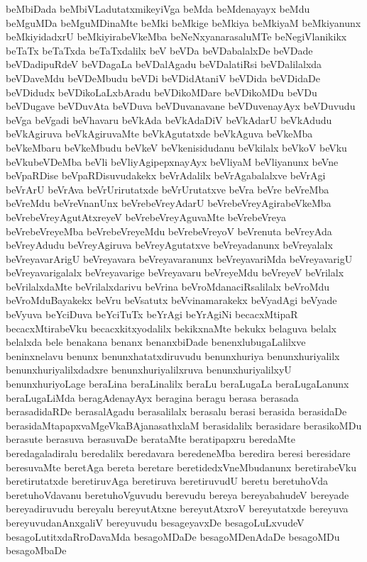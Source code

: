 {beMbiDada
beMbiVLadutatxmikeyiVga
beMda
beMdenayayx
beMdu
beMguMDa
beMguMDinaMte
beMki
beMkige
beMkiya
beMkiyaM
beMkiyanunx
beMkiyidadxrU
beMkiyirabeVkeMba
beNeNxyanarasaluMTe
beNegiVlanikikx
beTaTx
beTaTxda
beTaTxdalilx
beV
beVDa
beVDabalalxDe
beVDade
beVDadipuRdeV
beVDagaLa
beVDalAgadu
beVDalatiRsi
beVDalilalxda
beVDaveMdu
beVDeMbudu
beVDi
beVDidAtaniV
beVDida
beVDidaDe
beVDidudx
beVDikoLaLxbAradu
beVDikoMDare
beVDikoMDu
beVDu
beVDugave
beVDuvAta
beVDuva
beVDuvanavane
beVDuvenayAyx
beVDuvudu
beVga
beVgadi
beVhavaru
beVkAda
beVkAdaDiV
beVkAdarU
beVkAdudu
beVkAgiruva
beVkAgiruvaMte
beVkAgutatxde
beVkAguva
beVkeMba
beVkeMbaru
beVkeMbudu
beVkeV
beVkenisidudanu
beVkilalx
beVkoV
beVku
beVkubeVDeMba
beVli
beVliyAgipepxnayAyx
beVliyaM
beVliyanunx
beVne
beVpaRDise
beVpaRDisuvudakekx
beVrAdalilx
beVrAgabalalxve
beVrAgi
beVrArU
beVrAva
beVrUrirutatxde
beVrUrutatxve
beVra
beVre
beVreMba
beVreMdu
beVreVnanUnx
beVrebeVreyAdarU
beVrebeVreyAgirabeVkeMba
beVrebeVreyAgutAtxreyeV
beVrebeVreyAguvaMte
beVrebeVreya
beVrebeVreyeMba
beVrebeVreyeMdu
beVrebeVreyoV
beVrenuta
beVreyAda
beVreyAdudu
beVreyAgiruva
beVreyAgutatxve
beVreyadanunx
beVreyalalx
beVreyavarArigU
beVreyavara
beVreyavaranunx
beVreyavariMda
beVreyavarigU
beVreyavarigalalx
beVreyavarige
beVreyavaru
beVreyeMdu
beVreyeV
beVrilalx
beVrilalxdaMte
beVrilalxdarivu
beVrina
beVroMdanaciRsalilalx
beVroMdu
beVroMduBayakekx
beVru
beVsatutx
beVvinamarakekx
beVyadAgi
beVyade
beVyuva
beYciDuva
beYciTuTx
beYrAgi
beYrAgiNi
becacxMtipaR
becacxMtirabeVku
becacxkitxyodalilx
bekikxnaMte
bekukx
belaguva
belalx
belalxda
bele
benakana
benanx
benanxbiDade
benenxlubugaLalilxve
beninxnelavu
benunx
benunxhatatxdiruvudu
benunxhuriya
benunxhuriyalilx
benunxhuriyalilxdadxre
benunxhuriyalilxruva
benunxhuriyalilxyU
benunxhuriyoLage
beraLina
beraLinalilx
beraLu
beraLugaLa
beraLugaLanunx
beraLugaLiMda
beragAdenayAyx
beragina
beragu
berasa
berasada
berasadidaRDe
berasalAgadu
berasalilalx
berasalu
berasi
berasida
berasidaDe
berasidaMtapapxvaMgeVkaBAjanasathxlaM
berasidalilx
berasidare
berasikoMDu
berasute
berasuva
berasuvaDe
berataMte
beratipapxru
beredaMte
beredagaladiralu
beredalilx
beredavara
beredeneMba
beredira
beresi
beresidare
beresuvaMte
beretAga
bereta
beretare
beretidedxVneMbudanunx
beretirabeVku
beretirutatxde
beretiruvAga
beretiruva
beretiruvudU
beretu
beretuhoVda
beretuhoVdavanu
beretuhoVguvudu
berevudu
bereya
bereyabahudeV
bereyade
bereyadiruvudu
bereyalu
bereyutAtxne
bereyutAtxroV
bereyutatxde
bereyuva
bereyuvudanAnxgaliV
bereyuvudu
besageyavxDe
besagoLuLxvudeV
besagoLutitxdaRroDavaMda
besagoMDaDe
besagoMDenAdaDe
besagoMDu
besagoMbaDe
}
